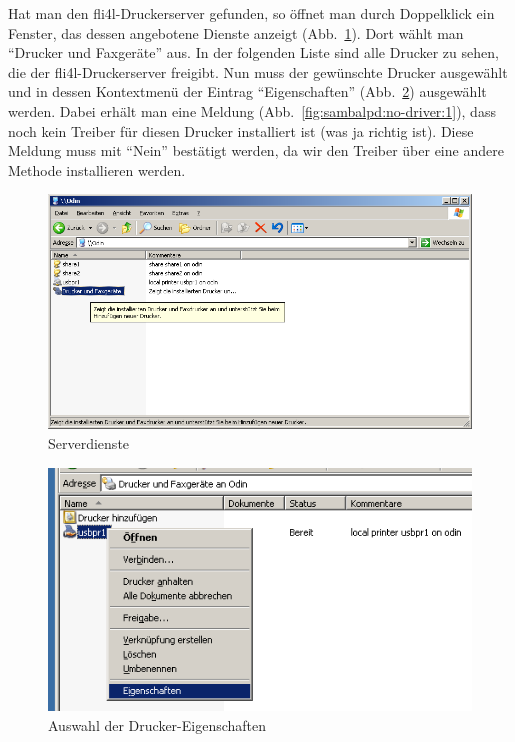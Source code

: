 Hat man den fli4l-Druckerserver gefunden, so öffnet man durch Doppelklick ein
Fenster, das dessen angebotene Dienste anzeigt
(Abb.~\ref{fig:sambalpd:services}). Dort wählt man ``Drucker und Faxgeräte''
aus. In der folgenden Liste sind alle Drucker zu sehen, die der
fli4l-Druckerserver freigibt. Nun muss der gewünschte Drucker ausgewählt und in
dessen Kontextmenü der Eintrag ``Eigenschaften''
(Abb.~\ref{fig:sambalpd:printerproperties}) ausgewählt werden. Dabei erhält man
eine Meldung (Abb.~\ref{fig:sambalpd:no-driver:1}), dass noch kein Treiber für
diesen Drucker installiert ist (was ja richtig ist). Diese Meldung muss mit
``Nein'' bestätigt werden, da wir den Treiber über eine andere Methode
installieren werden.

\begin{figure}[hbt!]
\centering
\includegraphics[width=\columnwidth]{image006}
\caption{Serverdienste}
\label{fig:sambalpd:services}
\end{figure}

\begin{figure}[hbt!]
\centering
\includegraphics[width=\columnwidth]{image007}
\caption{Auswahl der Drucker-Eigenschaften}
\label{fig:sambalpd:printerproperties}
\end{figure}

